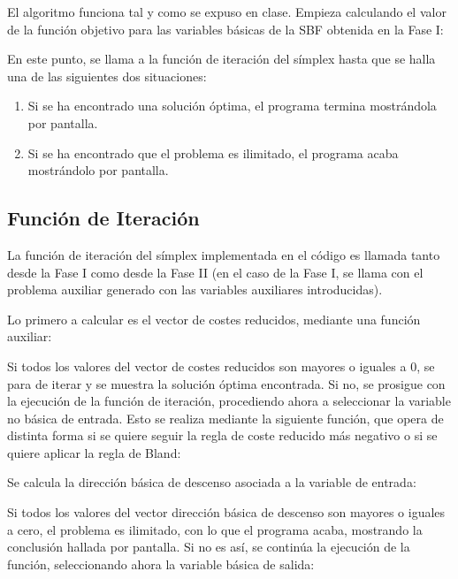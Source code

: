 \documentclass[11pt]{article}
\begin{document}
\noindent El algoritmo funciona tal y como se expuso en clase. Empieza calculando el valor de la función objetivo para las variables básicas de la SBF obtenida en la Fase I:

\noindent En este punto, se llama a la función de iteración del símplex hasta que se halla una de las siguientes dos situaciones:
\begin{enumerate}
    \item Si se ha encontrado una solución óptima, el programa termina mostrándola por pantalla.
    \item Si se ha encontrado que el problema es ilimitado, el programa acaba mostrándolo por pantalla.
\end{enumerate}

\subsection{Función de Iteración}

\noindent La función de iteración del símplex implementada en el código es llamada tanto desde la Fase I como desde la Fase II (en el caso de la Fase I, se llama con el problema auxiliar generado con las variables auxiliares introducidas).

\noindent Lo primero a calcular es el vector de costes reducidos, mediante una función auxiliar:

\noindent Si todos los valores del vector de costes reducidos son mayores o iguales a 0, se para de iterar y se muestra la solución óptima encontrada. Si no, se prosigue con la ejecución de la función de iteración, procediendo ahora a seleccionar la variable no básica de entrada. Esto se realiza mediante la siguiente función, que opera de distinta forma si se quiere seguir la regla de coste reducido más negativo o si se quiere aplicar la regla de Bland:

\noindent Se calcula la dirección básica de descenso asociada a la variable de entrada:

\noindent Si todos los valores del vector dirección básica de descenso son mayores o iguales a cero, el problema es ilimitado, con lo que el programa acaba, mostrando la conclusión hallada por pantalla. Si no es así, se continúa la ejecución de la función, seleccionando ahora la variable básica de salida:
\end{document}
